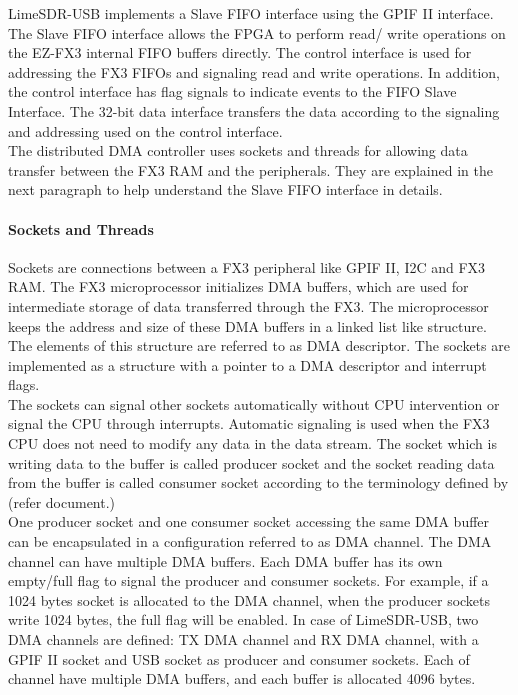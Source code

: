 LimeSDR-USB implements a Slave FIFO interface using the \ac{GPIF} II interface.
The Slave FIFO interface allows the \ac{FPGA} to perform read/ write operations on the EZ-FX3 internal FIFO buffers directly.
The control interface is used for addressing the FX3 FIFOs and signaling read and write operations.
In addition, the control interface has flag signals to indicate events to the FIFO Slave Interface.
The 32-bit data interface transfers the data according to the signaling and addressing used on the control interface.\\

The distributed \ac{DMA} controller uses sockets and threads for allowing data transfer between the FX3 RAM and the peripherals.
They are explained in the next paragraph to help understand the Slave FIFO interface in details.

\paragraph{Sockets and Threads}
Sockets are connections between a FX3 peripheral like GPIF II, I2C and FX3 RAM. 
The FX3 microprocessor initializes \ac{DMA} buffers, which are used for intermediate storage of data transferred through the FX3.
The microprocessor keeps the address and size of these \ac{DMA} buffers in a linked list like structure.
The elements of this structure are referred to as \ac{DMA} descriptor.
The sockets are implemented as a structure with a pointer to a \ac{DMA} descriptor and interrupt flags.\\ 

The sockets can signal other sockets automatically without CPU intervention or signal the CPU through interrupts.
Automatic signaling is used when the FX3 CPU does not need to modify any data in the data stream.
The socket which is writing data to the buffer is called producer socket and the socket reading data from the buffer is called consumer socket according to the terminology defined by (refer document.)\\

One producer socket and one consumer socket accessing the same \ac{DMA} buffer can be encapsulated in a configuration referred to as \ac{DMA} channel.
The \ac{DMA} channel can have multiple \ac{DMA} buffers.
Each DMA buffer has its own empty/full flag to signal the producer and consumer sockets.
For example, if a 1024 bytes socket is allocated to the DMA channel, when the producer sockets write 1024 bytes, the full flag will be enabled.
In case of LimeSDR-USB, two \ac{DMA} channels are defined: TX \ac{DMA} channel and RX \ac{DMA} channel, with a GPIF II socket and USB socket as producer and consumer sockets.
Each of channel have multiple \ac{DMA} buffers, and each buffer is allocated 4096 bytes.\\

